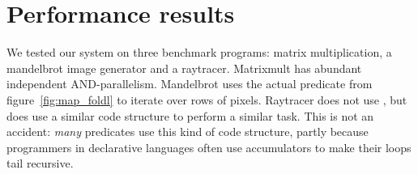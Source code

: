 \section{Performance results}
\label{sec:overlap_perf}



We tested our system on three benchmark programs:
matrix multiplication, a mandelbrot image generator and a raytracer.
Matrixmult has abundant independent AND-parallelism.
Mandelbrot uses the actual  predicate
from figure~\ref{fig:map_foldl}
to iterate over rows of pixels.
Raytracer does not use ,
but does use a similar code structure to perform a similar task.
This is not an accident:
\emph{many} predicates use this kind of code structure,
partly because programmers in declarative languages
often use accumulators to make their loops tail recursive.

